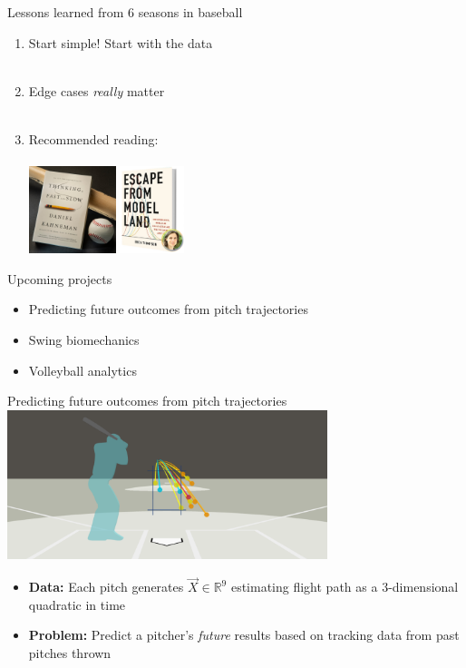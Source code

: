 \documentclass[handout]{beamer}
\def\mR{\mathbb R}\def\mS{\mathbb S}
\begin{document}
\begin{frame}{Lessons learned from 6 seasons in baseball}
  \begin{enumerate}
    \item Start simple! Start with the data\\~\\
    \item Edge cases {\it really} matter\\~\\
    \item Recommended reading:\\~\\
      \centering
      \includegraphics[height = 1in]{images/thinking_fast_and_slow.jpg}
      \hspace{1cm}
      \includegraphics[height = 1in]{images/escape_from_model_land.jpg}
  \end{enumerate}
\end{frame}

\begin{frame}{Upcoming projects}
  \begin{itemize}
    \item Predicting future outcomes from pitch trajectories
    \item Swing biomechanics
    \item Volleyball analytics
  \end{itemize}
\end{frame}

\begin{frame}{Predicting future outcomes from pitch trajectories}
  \centering
  \includegraphics[width = 0.7\textwidth]{images/pitch_tracking.png}
  \begin{itemize}
    \item {\bf Data:} Each pitch generates $\vec X \in \mR^9$ estimating flight path as a 3-dimensional quadratic in time
    \item {\bf Problem:} Predict a pitcher's {\it future} results based on tracking data from past pitches thrown
  \end{itemize}
\end{frame}
\end{document}
